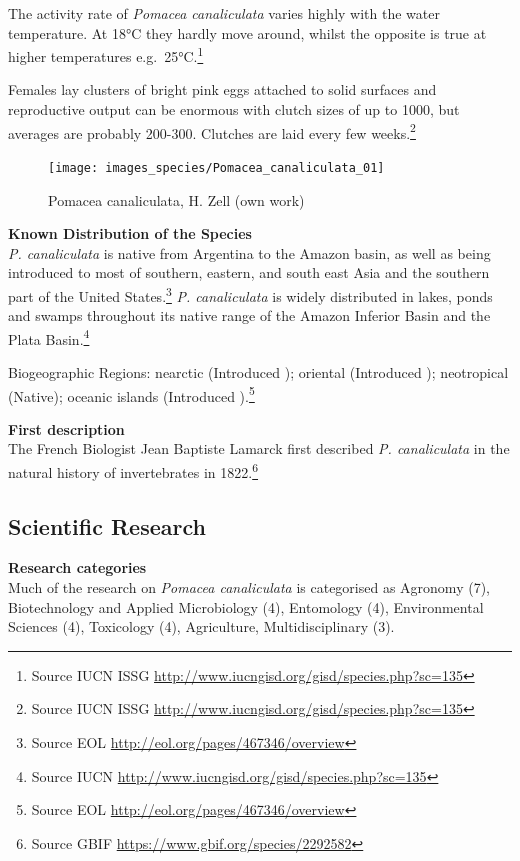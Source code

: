 \documentclass[]{book}
\theoremstyle{definition}
\theoremstyle{definition}
\theoremstyle{definition}
\theoremstyle{remark}
\begin{document}
The activity rate of \emph{Pomacea canaliculata} varies highly with the
water temperature. At 18°C they hardly move around, whilst the opposite
is true at higher temperatures e.g.~25°C.\footnote{Source IUCN ISSG
  \url{http://www.iucngisd.org/gisd/species.php?sc=135}}

Females lay clusters of bright pink eggs attached to solid surfaces and
reproductive output can be enormous with clutch sizes of up to 1000, but
averages are probably 200-300. Clutches are laid every few
weeks.\footnote{Source IUCN ISSG
  \url{http://www.iucngisd.org/gisd/species.php?sc=135}}

\begin{figure}

{\centering \texttt{[image: images\_species/Pomacea\_canaliculata\_01]} 

}

\caption{Pomacea canaliculata, H. Zell (own work)}\label{fig:unnamed-chunk-9}
\end{figure}

\textbf{Known Distribution of the Species}\\
\emph{P. canaliculata} is native from Argentina to the Amazon basin, as
well as being introduced to most of southern, eastern, and south east
Asia and the southern part of the United States.\footnote{Source EOL
  \url{http://eol.org/pages/467346/overview}} \emph{P. canaliculata} is
widely distributed in lakes, ponds and swamps throughout its native
range of the Amazon Inferior Basin and the Plata Basin.\footnote{Source
  IUCN \url{http://www.iucngisd.org/gisd/species.php?sc=135}}

Biogeographic Regions: nearctic (Introduced ); oriental (Introduced );
neotropical (Native); oceanic islands (Introduced ).\footnote{Source EOL
  \url{http://eol.org/pages/467346/overview}}

\textbf{First description}\\
The French Biologist Jean Baptiste Lamarck first described \emph{P.
canaliculata} in the natural history of invertebrates in 1822.\footnote{Source
  GBIF \url{https://www.gbif.org/species/2292582}}

\hypertarget{scientific-research-7}{%
\subsection{Scientific Research}\label{scientific-research-7}}

\textbf{Research categories}\\
Much of the research on \emph{Pomacea canaliculata} is categorised as
Agronomy (7), Biotechnology and Applied Microbiology (4), Entomology
(4), Environmental Sciences (4), Toxicology (4), Agriculture,
Multidisciplinary (3).
\end{document}
